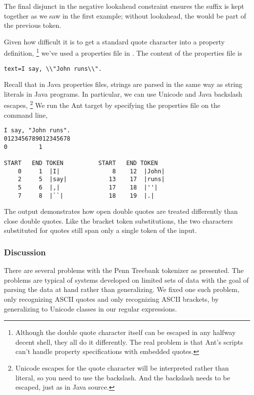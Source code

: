 The final disjunct in the negative
lookahead constraint ensures the suffix  is kept
together as we saw in the first example; without lookahead, the
 would be part of the previous token.

Given how difficult it is to get a standard quote character into a
property definition,%
%
\footnote{Although the double quote character itself can be escaped in
  any halfway decent shell, they all do it differently.  The real
  problem is that Ant's scripts can't handle  property
  specifications with embedded quotes.}
% 
we've used a properties file in
.  The content of the properties
file is 
%
\begin{verbatim}
text=I say, \\"John runs\\".
\end{verbatim}
%
Recall that in Java properties files, strings are parsed in the same
way as string literals in Java programs.  In particular, we can use
Unicode and Java backslash escapes,%
%
\footnote{Unicode escapes for the quote character will be interpreted
rather than literal, so you need to use the backslash.  And the
backslash needs to be escaped, just as in Java source.}
%
We run the Ant target by specifying the properties file on the
command line,
%
\begin{verbatim}
I say, "John runs".
0123456789012345678
0         1

START   END TOKEN          START   END TOKEN
    0     1  |I|               8    12  |John|
    2     5  |say|            13    17  |runs|
    5     6  |,|              17    18  |''|
    7     8  |``|             18    19  |.|
\end{verbatim}
%
The output demonstrates how open double quotes are treated differently
than close double quotes.  Like the bracket token substitutions,
the two characters substituted for quotes still span only a single token
of the input.


\subsubsection{Discussion}

There are several problems with the Penn Treebank tokenizer as
presented.  The problems are typical of systems developed on limited
sets of data with the goal of parsing the data at hand rather than
generalizing.  We fixed one such problem, only recognizing ASCII
quotes and only recognizing ASCII brackets, by generalizing to Unicode
classes in our regular expressions.

